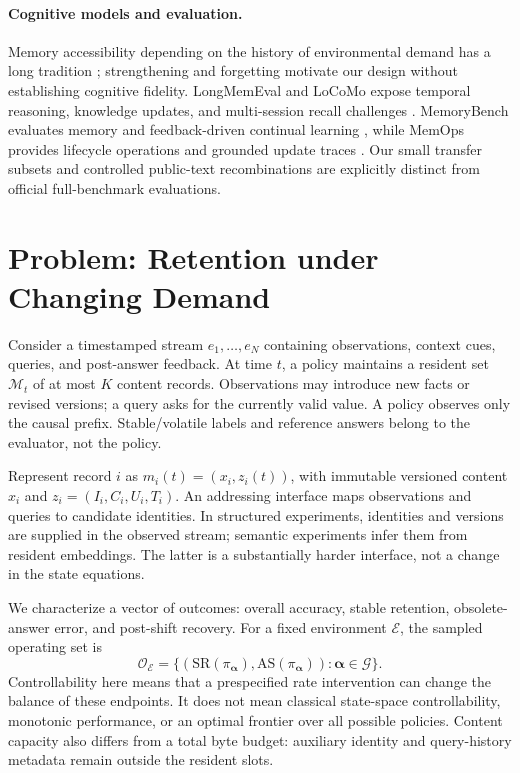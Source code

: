 \paragraph{Cognitive models and evaluation.}
Memory accessibility depending on the history of environmental demand has a long tradition \citep{anderson}; strengthening and forgetting motivate our design without establishing cognitive fidelity. LongMemEval and LoCoMo expose temporal reasoning, knowledge updates, and multi-session recall challenges \citep{longmemeval,locomo}. MemoryBench evaluates memory and feedback-driven continual learning \citep{memorybench}, while MemOps provides lifecycle operations and grounded update traces \citep{memops}. Our small transfer subsets and controlled public-text recombinations are explicitly distinct from official full-benchmark evaluations.

\section{Problem: Retention under Changing Demand}\label{sec:problem}
Consider a timestamped stream $e_1,\ldots,e_N$ containing observations, context cues, queries, and post-answer feedback. At time $t$, a policy maintains a resident set $\mathcal M_t$ of at most $K$ content records. Observations may introduce new facts or revised versions; a query asks for the currently valid value. A policy observes only the causal prefix. Stable/volatile labels and reference answers belong to the evaluator, not the policy.

Represent record $i$ as $m_i(t)=(x_i,z_i(t))$, with immutable versioned content $x_i$ and $z_i=(I_i,C_i,U_i,T_i)$. An addressing interface maps observations and queries to candidate identities. In structured experiments, identities and versions are supplied in the observed stream; semantic experiments infer them from resident embeddings. The latter is a substantially harder interface, not a change in the state equations.

We characterize a vector of outcomes: overall accuracy, stable retention, obsolete-answer error, and post-shift recovery. For a fixed environment $\mathcal E$, the sampled operating set is
\begin{equation}
\mathcal O_{\mathcal E}=\{(\mathrm{SR}(\pi_{\boldsymbol\alpha}),\mathrm{AS}(\pi_{\boldsymbol\alpha})):\boldsymbol\alpha\in\mathcal G\}.
\end{equation}
Controllability here means that a prespecified rate intervention can change the balance of these endpoints. It does not mean classical state-space controllability, monotonic performance, or an optimal frontier over all possible policies. Content capacity also differs from a total byte budget: auxiliary identity and query-history metadata remain outside the resident slots.

